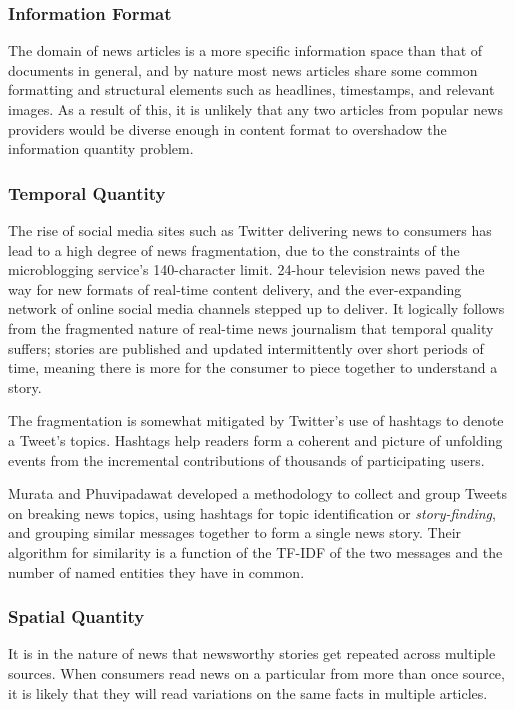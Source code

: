 \subsubsection{Information Format}
The domain of news articles is a more specific information space than that of documents in general, and by nature most news articles share some common formatting and structural elements such as headlines, timestamps, and relevant images. As a result of this, it is unlikely that any two articles from popular news providers would be diverse enough in content format to overshadow the information quantity problem.

\subsubsection{Temporal Quantity}

The rise of social media sites such as Twitter delivering news to consumers has lead to a high degree of news fragmentation, due to the constraints of the microblogging service's 140-character limit. 24-hour television news paved the way for new formats of real-time content delivery, and the ever-expanding network of online social media channels stepped up to deliver. It logically follows from the fragmented nature of real-time news journalism that temporal quality suffers; stories are published and updated intermittently over short periods of time, meaning there is more for the consumer to piece together to understand a story.

The fragmentation is somewhat mitigated by Twitter's use of hashtags to denote a Tweet's topics. Hashtags help readers form a coherent and picture of unfolding events from the incremental contributions of thousands of participating users. \citep{BlogsTwitterAndBreakingNews}


Murata and Phuvipadawat \citep{BreakingNewsDetectionAndTrackingInTwitter} developed a methodology to collect and group Tweets on breaking news topics, using hashtags for topic identification or \textit{story-finding}, and grouping similar messages together to form a single news story. Their algorithm for similarity is a function of the TF-IDF \citep{IntroductionToInformationRetrieval} of the two messages and the number of named entities they have in common.

\subsubsection{Spatial Quantity}
It is in the nature of news that newsworthy stories get repeated across multiple sources. When consumers read news on a particular from more than once source, it is likely that they will read variations on the same facts in multiple articles.


